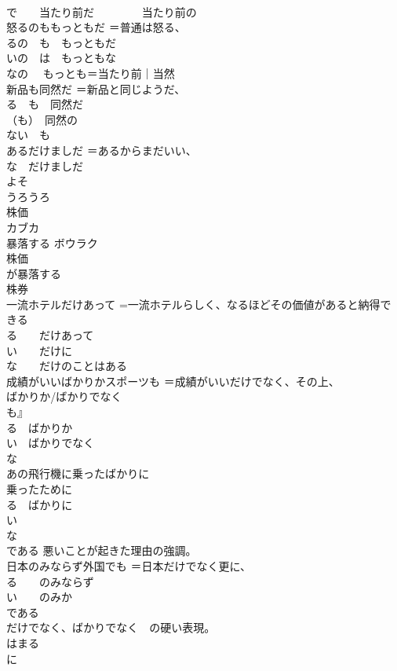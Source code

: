\documentclass[8pt]{extreport}
\begin{document}
\begin{CJK}{UTF8}{min}
\\	で　　当たり前だ 　　　　当たり前の
\\	怒るのももっともだ	＝普通は怒る、
\\	るの　も　もっともだ 
\\	いの　は　もっともな
\\	なの　 もっとも＝当たり前｜当然
\\	新品も同然だ	＝新品と同じようだ、
\\	る　も　同然だ 
\\	（も）　同然の
\\	ない　も
\\	あるだけましだ	＝あるからまだいい、
\\	な　だけましだ
\\	よそ	
\\	うろうろ	
\\	株価	
\\	カブカ
\\	暴落する	ボウラク 
\\	株価
\\	が暴落する
\\	株券	
\\	一流ホテルだけあって	=一流ホテルらしく、なるほどその価値があると納得できる 
\\	る　　だけあって 
\\	い　　だけに 
\\	な　　だけのことはある 
\\	成績がいいばかりかスポーツも	＝成績がいいだけでなく、その上、
\\	ばかりか/ばかりでなく
\\	も』 
\\	る　ばかりか 
\\	い　ばかりでなく 
\\	な 
\\	あの飛行機に乗ったばかりに	
\\	乗ったために 
\\	る　ばかりに 
\\	い 
\\	な 
\\	である 悪いことが起きた理由の強調。
\\	日本のみならず外国でも	＝日本だけでなく更に、
\\	る　　のみならず 
\\	い　　のみか 
\\	である 
\\	だけでなく、ばかりでなく　の硬い表現。
\\	はまる	
\\	に 

\end{CJK}
\end{document}
